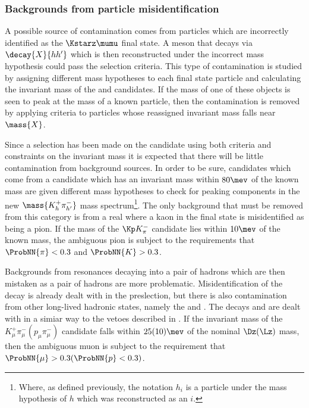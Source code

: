 %

\subsubsection{Backgrounds from particle misidentification}
\label{sec:db:backgrounds:misid}
A possible source of contamination comes from particles which are incorrectly identified as the
$\Kstarz\mumu$ final state.
A meson that decays via $\decay{X}{hh^\prime}$ which is then reconstructed
under the incorrect mass hypothesis could pass the selection criteria.
This type of contamination is studied by assigning different mass hypotheses to each final state
particle and calculating the invariant mass of the \mumu and \kpi candidates.
If the mass of one of these objects is seen to peak at the mass of a known particle, then the
contamination is removed  by applying \pid criteria to particles whose reassigned invariant mass
falls near $\mass{X}$.

Since a selection has been made on the \decay{\Kstarz}{\kpi} candidate using both \pid criteria and
constraints on the \kpi invariant mass it is expected that there will be little contamination
from background sources.
In order to be sure, \Kstarz candidates which come from a \Bd candidate which has an invariant mass
within $80\mev$ of the known \Bd mass are given different mass hypotheses to check for peaking
components in the new $\mass{K_{h}^+\pi_{h^\prime}^-}$ mass spectrum\footnote{
  Where, as defined previously, the notation $h_i$ is a particle under the mass hypothesis of $h$
  which was reconstructed as an $i$.
}.
The only background that must be removed from this category is from a real \decay{\phi}{\kk}
where a kaon in the final state is misidentified as being a pion.
If the mass of the $\Kp K^-_\pi$ candidate lies within $10\mev$ of the known \phii mass, the
ambiguous pion is subject to the requirements that
$\ProbNN{\pi}<0.3$ and $\ProbNN{K}>0.3$.

Backgrounds from resonances decaying into a pair of hadrons which are then mistaken as a pair of
hadrons are more problematic.
Misidentification of the decay \decay{\KS}{\pipi} is already dealt with in the preslection, but
there is also contamination from other long-lived hadronic states, namely the \Dz and \Lz.
The decays \decay{\Dz}{\kpi} and  are dealt with in a simiar way to the vetoes
described in .
If the invariant mass of the $K^+_\mu\pi^-_\mu(p_\mu\pi^-_\mu)$ candidate falls within $25(10)\mev$
of the nominal $\Dz(\Lz)$ mass, then the ambiguous muon is subject to the requirement that
$\ProbNN{\mu}>0.3(\ProbNN{p}<0.3)$.


